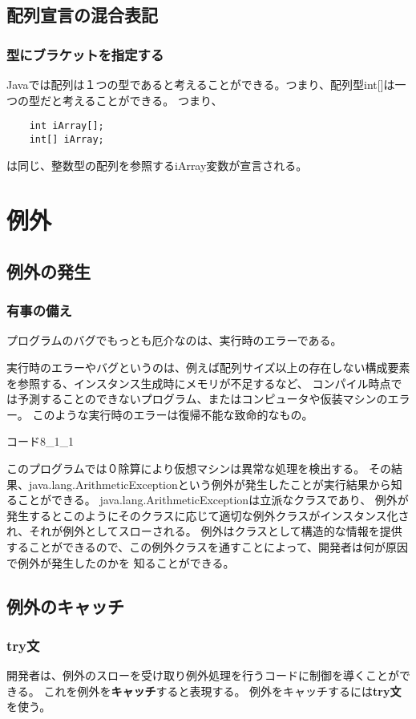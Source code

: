\documentclass[12pt,a4j,twoside]{jsbook}
\begin{document}
\section{配列宣言の混合表記}
\subsection{型にブラケットを指定する}
Javaでは配列は１つの型であると考えることができる。つまり、配列型int[]は一つの型だと考えることができる。
つまり、
\begin{lstlisting}
    int iArray[];
    int[] iArray;
\end{lstlisting}
は同じ、整数型の配列を参照するiArray変数が宣言される。
\chapter{例外}
\section{例外の発生}
\subsection{有事の備え}
プログラムのバグでもっとも厄介なのは、実行時のエラーである。

実行時のエラーやバグというのは、例えば配列サイズ以上の存在しない構成要素を参照する、インスタンス生成時にメモリが不足するなど、
コンパイル時点では予測することのできないプログラム、またはコンピュータや仮装マシンのエラー。
このような実行時のエラーは復帰不能な致命的なもの。

コード8\_1\_1

このプログラムでは０除算により仮想マシンは異常な処理を検出する。
その結果、java.lang.ArithmeticExceptionという例外が発生したことが実行結果から知ることができる。
java.lang.ArithmeticExceptionは立派なクラスであり、
例外が発生するとこのようにそのクラスに応じて適切な例外クラスがインスタンス化され、それが例外としてスローされる。
例外はクラスとして構造的な情報を提供することができるので、この例外クラスを通すことによって、開発者は何が原因で例外が発生したのかを
知ることができる。
\section{例外のキャッチ}
\subsection{try文}
開発者は、例外のスローを受け取り例外処理を行うコードに制御を導くことができる。
これを例外を\textbf{キャッチ}すると表現する。
例外をキャッチするには\textbf{try文}を使う。
\end{document}
